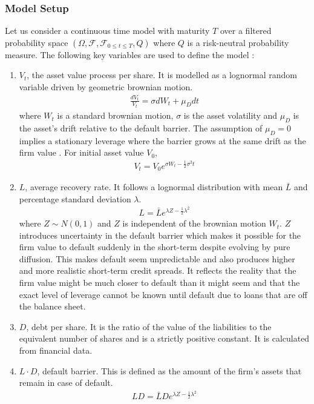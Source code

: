 \documentclass[11t,a4paper]{article}
\begin{document}
\subsubsection{Model Setup}
Let us consider a continuous time model with maturity $T$ over a filtered probability space $(\Omega, \mathcal{F}, \mathcal{F}_{0\leq{t}\leq{T}}, Q)$ where $Q$ is a risk-neutral probability measure. The following key variables are used to define the model \cite{cgtechdoc}:
\begin{enumerate}
\item $V_t$, the asset value process per share. It is modelled as a lognormal random variable driven by geometric brownian motion. 
\begin{align} \frac{dV_t}{V_t} = \sigma dW_t + \mu_Ddt\end{align}
where $W_t$ is a standard brownian motion, $\sigma$ is the asset volatility and $\mu_D$ is the asset's drift relative to the default barrier. The assumption of $\mu_D=0$ implies a stationary leverage where the barrier grows at the same drift as the firm value \cite{sfin}. For initial asset value $V_0$, 
\begin{align} V_t = V_0e^{\sigma W_t-\frac{1}{2}\sigma^2t} \end{align}
\item $L$, average recovery rate. It follows a lognormal distribution with mean $\bar{L}$ and percentage standard deviation $\lambda$.
\begin{align} L  = \bar{L}e^{\lambda Z - \frac{1}{2}\lambda^2} \end{align}
where $Z \sim N(0,1)$ and $Z$ is independent of the brownian motion $W_t$. $Z$ introduces uncertainty in the default barrier which makes it possible for the firm value to default suddenly in the short-term despite evolving by pure diffusion. This makes default seem unpredictable and also produces higher and more realistic short-term credit spreads. It reflects the reality that the firm value might be much closer to default than it might seem and that the exact level of leverage cannot be known until default due to loans that are off the balance sheet.
\item $D$, debt per share. It is the ratio of the value of the liabilities to the equivalent number of shares and is a strictly positive constant. It is calculated from financial data. 
\item $L\cdot D$, default barrier. This is defined as the amount of the firm's assets that remain in case of default. 
\begin{align} L D = \bar{L}De^{\lambda Z - \frac{1}{2}\lambda^2} \end{align}

\end{enumerate}
\end{document}
